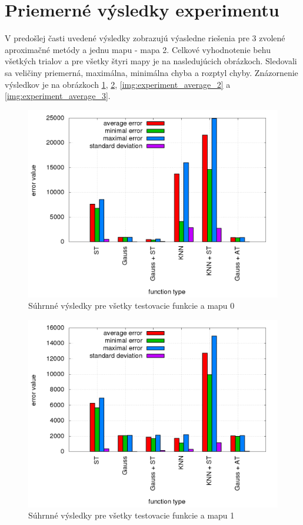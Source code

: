 \newpage
\section {Priemerné výsledky experimentu}

V predošlej časti uvedené výsledky zobrazujú výasledne riešenia pre 3 zvolené aproximačné
metódy a jednu mapu - mapa 2. Celkové vyhodnotenie behu všetkých trialov a pre všetky
štyri mapy je na nasledujúcich obrázkoch. Sledovali sa veličiny priemerná, maximálna, minimálna chyba
a rozptyl chyby. Znázornenie výsledkov je na obrázkoch \ref{img:experiment_average_0},
\ref{img:experiment_average_1}, \ref{img:experiment_average_2} a \ref{img:experiment_average_3}.

\begin{figure}[!htb]
\centering
\includegraphics[scale=.4]{../../results_q_learning/map_0/trials_average_results.png}
\caption{Súhrnné výsledky pre všetky testovacie funkcie a mapu 0}
\label{img:experiment_average_0}
\end{figure}

\begin{figure}[!htb]
\centering
\includegraphics[scale=.4]{../../results_q_learning/map_1/trials_average_results.png}
\caption{Súhrnné výsledky pre všetky testovacie funkcie a mapu 1}
\label{img:experiment_average_1}
\end{figure}

